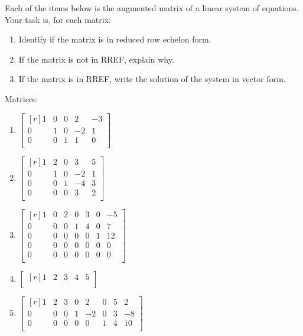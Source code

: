 \documentclass[12pt]{article}
\begin{document}
Each of the items below is the augmented matrix of a linear system of equations. Your task is, for each matrix:
\begin{enumerate}
\item Identify if the matrix is in reduced row echelon form.
\item If the matrix is not in RREF, explain why.
\item If the matrix is in RREF, write the solution of the system in vector form.
\end{enumerate}

Matrices:

\begin{enumerate}
\item
$\begin{bmatrix*}[r]
1 & 0 & 0 & 2 & -3\\
0 & 1 & 0 & -2 & 1\\
0 & 0 & 1 &  1 & 0\\
\end{bmatrix*}$

\item
$\begin{bmatrix*}[r]
1 & 2 & 0 & 3 & 5\\
0 & 1 & 0 & -2 & 1\\
0 & 0 & 1 & -4 & 3\\
0 & 0 & 0 & 3  & 2\\
\end{bmatrix*}$

\item
$\begin{bmatrix*}[r]
1 & 0 & 2 & 0 & 3 & 0 & -5\\
0 & 0 & 0 & 1 & 4 & 0 & 7\\
0 & 0 & 0 & 0 & 0 & 1 & 12\\
0 & 0 & 0 & 0 & 0 & 0 & 0\\
0 & 0 & 0 & 0 & 0 & 0 & 0\\
\end{bmatrix*}$

\item
$\begin{bmatrix*}[r]
1 & 2 & 3 & 4 & 5\\
\end{bmatrix*}$

\item
$\begin{bmatrix*}[r]
1 & 2 & 3 & 0 & 2  & 0 & 5 & 2\\
0 & 0 & 0 & 1 & -2 & 0 & 3 & -8\\
0 & 0 & 0 & 0 & 0  & 1 & 4 & 10\\
\end{bmatrix*}$


\end{enumerate}
\end{document}
